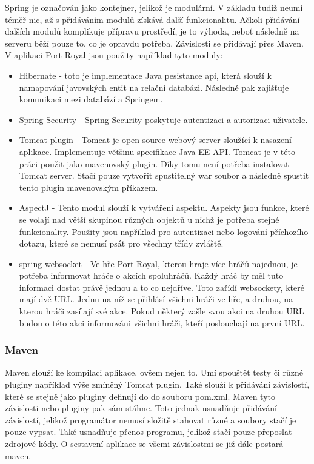 \documentclass[czech,master,public,dept460,male,cpdeclaration,twoside]{diploma}
\begin{document}
Spring je označován jako kontejner, jelikož je modulární. V základu tudíž neumí téměř nic, až s přidáváním modulů získává další funkcionalitu. Ačkoli  přidávání dalších modulů komplikuje přípravu prostředí, je to výhoda, neboť následně na serveru běží pouze to, co je opravdu potřeba. Závislosti se přidávají přes Maven. V aplikaci Port Royal jsou použity například tyto moduly:
\begin{itemize}
	\item Hibernate - toto je implementace Java pesistance api, která slouží k namapování javovských entit na relační databázi. Následně pak zajišťuje komunikaci mezi databází a Springem.
	\item Spring Security - Spring Security poskytuje autentizaci a autorizaci uživatele.
	\item Tomcat plugin - Tomcat je open source webový server sloužící k nasazení aplikace. Implementuje většinu specifikace Java EE API. Tomcat je v této práci použit jako mavenovský plugin. Díky tomu není potřeba instalovat Tomcat server. Stačí pouze vytvořit spustitelný war soubor a následně spustit tento plugin mavenovským příkazem.
	\item AspectJ - Tento modul slouží k vytváření aspektu. Aspekty jsou funkce, které se volají nad větší skupinou různých objektů u nichž je potřeba stejné funkcionality. Použity jsou například pro autentizaci nebo logování příchozího dotazu, které se nemusí psát pro všechny třídy zvláště.
	\item spring websocket - Ve hře Port Royal, kterou hraje více hráčů najednou, je potřeba informovat hráče o akcích spoluhráčů. Každý hráč by měl tuto informaci dostat právě jednou a to co nejdříve. Toto zařídí websockety, které mají dvě URL. Jednu na níž se přihlásí všichni hráči ve hře, a druhou, na kterou hráči zasílají své akce. Pokud některý zašle svou akci na druhou URL budou o této akci informováni všichni hráči, kteří poslouchají na první URL.
\end{itemize}

\subsubsection{Maven}
Maven slouží ke kompilaci aplikace, ovšem nejen to. Umí spouštět testy či různé pluginy například výše zmíněný Tomcat plugin. Také slouží k přidávání závislostí, které se stejně jako pluginy definují do do souboru pom.xml. Maven tyto závislosti nebo pluginy pak sám stáhne. Toto jednak usnadňuje přidávání závislostí, jelikož programátor nemusí složitě stahovat různé a soubory stačí je pouze vypsat. Také usnadňuje přenos programu, jelikož stačí pouze přeposlat zdrojové kódy. O sestavení aplikace se všemi závislostmi se již dále postará maven.
\end{document}
